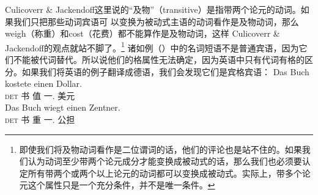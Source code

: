 Culicoverr \& Jackendoff这里说的“及物”（transitive）是指带两个论元的动词。如果我们只把那些动词宾语可
以变换为被动式主语的动词看作是及物动词，那么weigh（称重）和cost（花费）都不能算作是及物动词，这样
Culicoverr \& Jackendoff的观点就站不脚了。\footnote{%
即使我们将及物动词看作是二位谓词的话，他们的评论也是站不住的。如果我们认为动词至少带两个论元成分才能变换成被动式的话，那么我们也必须要认定所有带两个或两个以上论元的动词都可以变换成被动式。实际上，带多个论元这个属性只是一个充分条件，并不是唯一条件。}
诸如例（）中的名词短语不是普通宾语，因为它们不能被代词替代。所以说他们的格属性无法确定，因为英语中只有代词有格的区分。如果我们将英语的例子翻译成德语，我们会发现它们是宾格宾语：
\eal
\ex 
\gll Das Buch kostete einen Dollar.\\
       \textsc{det} 书 值 一.\acc{} 美元\\
\ex 
\gll Das Buch wiegt einen Zentner.\\
     \textsc{det} 书 重 一.\acc{} 公担\\
\zl


